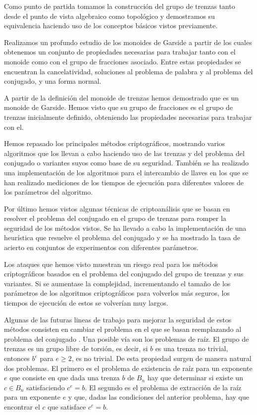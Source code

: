 \documentclass[12pt]{book}
\theoremstyle{definition}
\begin{document}
Como punto de partida tomamos la construcción del grupo de trenzas tanto desde el punto de vista algebraico como topológico y demostramos su equivalencia haciendo uso de los conceptos básicos vistos previamente.

Realizamos un profundo estudio de los monoides de Garside a partir de los cuales obtenemos un conjunto de propiedades necesarias para trabajar tanto con el monoide como con el grupo de fracciones asociado. Entre estas propiedades se encuentran la cancelatividad, soluciones al problema de palabra y al problema del conjugado, y una forma normal.

A partir de la definición del monoide de trenzas hemos demostrado que es un monoide de Garside. Hemos visto que su grupo de fracciones es el grupo de trenzas inicialmente definido, obteniendo las propiedades necesarias para trabajar con el.

Hemos repasado los principales métodos criptográficos, mostrando varios algoritmos que los llevan a cabo haciendo uso de las trenzas y del problema del conjugado o variantes suyos como base de su seguridad. También se ha realizado una implementación de los algoritmos para el intercambio de llaves en los que se han realizado mediciones de los tiempos de ejecución para diferentes valores de los parámetros del algoritmo.

Por último hemos vistos algunas técnicas de criptoanálisis que se basan en resolver el problema del conjugado en el grupo de trenzas para romper la seguridad de los métodos vistos. Se ha llevado a cabo la implementación de una heurística que resuelve el problema del conjugado y se ha mostrado la tasa de acierto en conjuntos de experimentos con diferentes parámetros.

Los ataques que hemos visto muestran un riesgo real para los métodos criptográficos basados en el problema del conjugado del grupo de trenzas y sus variantes. Si se aumentase la complejidad, incrementando el tamaño de los parámetros de los algoritmos criptográficos para volverlos más seguros, los tiempos de ejecución de estos se volverían muy largos.

Algunas de las futuras lineas de trabajo para mejorar la seguridad de estos métodos consisten en cambiar el problema en el que se basan reemplazando al problema del conjugado \cite{Deh}. Una posible vía son los problemas de raíz. El grupo de trenzas es un grupo libre de torsión, es decir, si $b$ es una trenza no trivial, entonces $b^e$ para $e\geq 2$, es no trivial. De esta propiedad surgen de manera natural dos problemas. El primero es el problema de existencia de raíz para un exponente $e$ que consiste en que dada una trenza $b$ de $B_n$ hay que determinar si existe un $c\in B_n$ satisfaciendo $c^e=b$. El segundo  es el problema de extracción de la raíz para un exponente $e$ y que, dadas las condiciones del anterior problema, hay que encontrar  el $c$ que satisface $c^e=b$.
\end{document}
